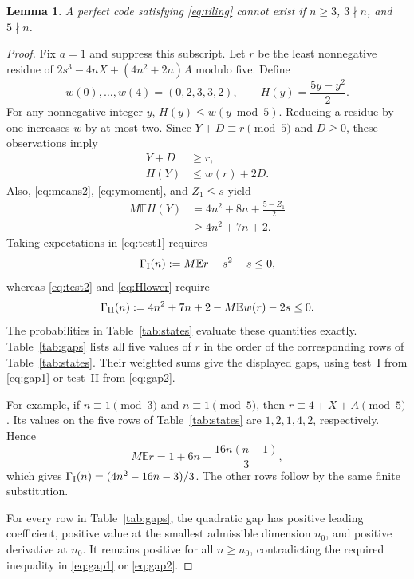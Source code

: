 \documentclass[12pt,letterpaper,onecolumn]{article}
\newtheorem{lemma}[theorem]{Lemma}
\theoremstyle{definition}
\newcommand{\E}{\mathbb{E}}
\begin{document}
\begin{lemma}\label{lem:mod15}
A perfect code satisfying \eqref{eq:tiling} cannot exist if $n\ge3$, $3\nmid n$, and $5\nmid n$.
\end{lemma}
\begin{proof}
Fix $a=1$ and suppress this subscript. Let $r$ be the least nonnegative residue of $2s^3-4nX+(4n^2+2n)A$ modulo five. Define
\[
 w(0),\ldots,w(4)=(0,2,3,3,2),\qquad
 H(y)=\frac{5y-y^2}{2}.
\]
For any nonnegative integer $y$, $H(y)\le w(y\bmod5)$. Reducing a residue by one increases $w$ by at most two. Since $Y+D\equiv r\pmod5$ and $D\ge0$, these observations imply
\begin{align}
 Y+D&\ge r,\label{eq:test1}\\
 H(Y)&\le w(r)+2D.\label{eq:test2}
\end{align}
Also, \eqref{eq:means2}, \eqref{eq:ymoment}, and $Z_1\le s$ yield
\begin{align}\label{eq:Hlower}
 M\E H(Y)
 &=4n^2+8n+\frac{5-Z_1}{2}\nonumber\\
 &\ge4n^2+7n+2.
\end{align}
Taking expectations in \eqref{eq:test1} requires
\begin{equation}\label{eq:gap1}
 \Gamma_{\rm I}(n):=M\E r-s^2-s\le0,
\end{equation}
whereas \eqref{eq:test2} and \eqref{eq:Hlower} require
\begin{equation}\label{eq:gap2}
 \Gamma_{\rm II}(n):=4n^2+7n+2-M\E w(r)-2s\le0.
\end{equation}
The probabilities in Table~\ref{tab:states} evaluate these quantities exactly. Table~\ref{tab:gaps} lists all five values of $r$ in the order of the corresponding rows of Table~\ref{tab:states}. Their weighted sums give the displayed gaps, using test~I from \eqref{eq:gap1} or test~II from \eqref{eq:gap2}.

For example, if $n\equiv1\pmod3$ and $n\equiv1\pmod5$, then $r\equiv4+X+A\pmod5$. Its values on the five rows of Table~\ref{tab:states} are $1,2,1,4,2$, respectively. Hence
\[
 M\E r=1+6n+\frac{16n(n-1)}3,
\]
which gives $\Gamma_{\rm I}(n)=(4n^2-16n-3)/3$. The other rows follow by the same finite substitution.

For every row in Table~\ref{tab:gaps}, the quadratic gap has positive leading coefficient, positive value at the smallest admissible dimension $n_0$, and positive derivative at $n_0$. It remains positive for all $n\ge n_0$, contradicting the required inequality in \eqref{eq:gap1} or \eqref{eq:gap2}.
\end{proof}
\end{document}

